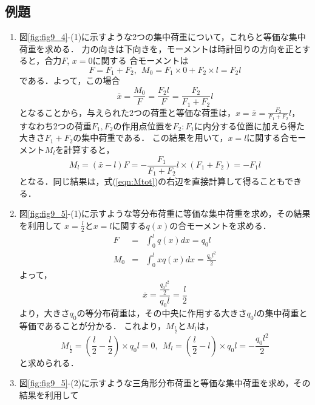\documentclass[10pt,a4j]{jarticle}
\begin{document}
\subsection{例題}
\begin{enumerate}
\item
図\ref{fig:fig9_4}-(1)に示すような2つの集中荷重について，これらと等価な集中荷重を求める．
力の向きは下向きを，モーメントは時計回りの方向を正とすると，合力$F$, $x=0$に関する
合モーメントは
\begin{equation}
	F=F_1+F_2, \ \ M_0=F_1\times 0 + F_2 \times l =F_2l
	\label{eqn:ans1_1}
\end{equation}
である．よって，この場合
\begin{equation}
	\bar x = \frac{M_0}{F}=\frac{F_2l}{F}= \frac{F_2}{F_1+F_2}l
	\label{eqn:xbar1_1}
\end{equation}
となることから，与えられた2つの荷重と等価な荷重は，$x=\bar x = \frac{F_2}{F_1+F_2}l$，
すなわち2つの荷重$F_1,F_2$の作用点位置を$F_2:F_1$に内分する位置に加えら得た
大きさ$F_1+F_2$の集中荷重である．
この結果を用いて，$x=l$に関する合モーメント$M_l$を計算すると，
\begin{equation}
	M_l=(\bar x- l ) F = -\frac{F_1}{F_1+F_2}l \times (F_1+F_2)= -F_1l
	\label{eqn:Ml1_1}
\end{equation}
となる．同じ結果は，式(\ref{eqn:Mtot})の右辺を直接計算して得ることもできる．
\item
図\ref{fig:fig9_5}-(1)に示すような等分布荷重に等価な集中荷重を求め，その結果を利用して
$x=\frac{l}{2}$と$x=l$に関する$q(x)$の合モーメントを求める．
\begin{eqnarray}
	F & =& \int _0^l q(x)dx= q_0l
	\label{eqn:}
	\\
	M_0 & =& \int _0^l xq(x)dx= \frac{q_0l^2}{2}
\end{eqnarray}
よって，
\begin{equation}
	\bar x= \frac{\frac{q_0l^2}{2}}{q_0l}=\frac{l}{2}
	\label{eqn:xbar_rec}
\end{equation}
より，大きさ$q_0$の等分布荷重は，その中央に作用する大きさ$q_0l$の集中荷重と等価であることが分かる．
これより，$M_{\frac{l}{2}}$と$M_{l}$は，
\begin{equation}
	M_{\frac{l}{2}}=\left(\frac{l}{2}-\frac{l}{2}\right)\times q_0l = 0 ,\ \ 
	M_{l}=\left(\frac{l}{2}-l\right)\times q_0l = -\frac{q_0l^2}{2}
	\label{eqn:}
\end{equation}
と求められる．
\item
図\ref{fig:fig9_5}-(2)に示すような三角形分布荷重と等価な集中荷重を求め，その結果を利用して

\end{enumerate}
\end{document}
